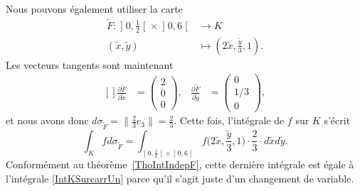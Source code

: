 Nous pouvons également utiliser la carte
\begin{equation}
	\begin{aligned}
		\tilde F\colon \mathopen] 0 , \frac{ 1 }{2} \mathclose[\times\mathopen] 0 , 6 \mathclose[ & \to K                                         \\
		(\tilde x,\tilde y)                                                                       & \mapsto (2\tilde x,\frac{ \tilde y }{ 3 },1).
	\end{aligned}
\end{equation}
Les vecteurs tangents sont maintenant
\begin{equation}
	\begin{aligned}[]
		\frac{ \partial \tilde F }{ \partial \tilde x } & =\begin{pmatrix}
			                                                   2 \\
			                                                   0 \\
			                                                   0
		                                                   \end{pmatrix},
		                                                & \frac{ \partial \tilde F }{ \partial \tilde y } & =\begin{pmatrix}
			                                                                                                     0   \\
			                                                                                                     1/3 \\
			                                                                                                     0
		                                                                                                     \end{pmatrix},
	\end{aligned}
\end{equation}
et nous avons donc \( d\sigma_{\tilde F}=\| \frac{ 2 }{ 3 }e_3 \|=\frac{ 2 }{ 3 }\). Cette fois, l'intégrale de \( f\) sur \( K\) s'écrit
\begin{equation}
	\int_Kfd\sigma_{\tilde F}=\int_{\mathopen] 0 , \frac{ 1 }{2} \mathclose[\times\mathopen] 0 , 6 \mathclose[}f\big( 2\tilde x,\frac{ \tilde y }{ 3 },1 \big)\cdot\frac{ 2 }{ 3 }\cdot d\tilde xd\tilde y.
\end{equation}
Conformément au théorème~\ref{ThoIntIndepF}, cette dernière intégrale est égale à l'intégrale \eqref{IntKSurcarrUn} parce qu'il s'agit juste d'un changement de variable.

